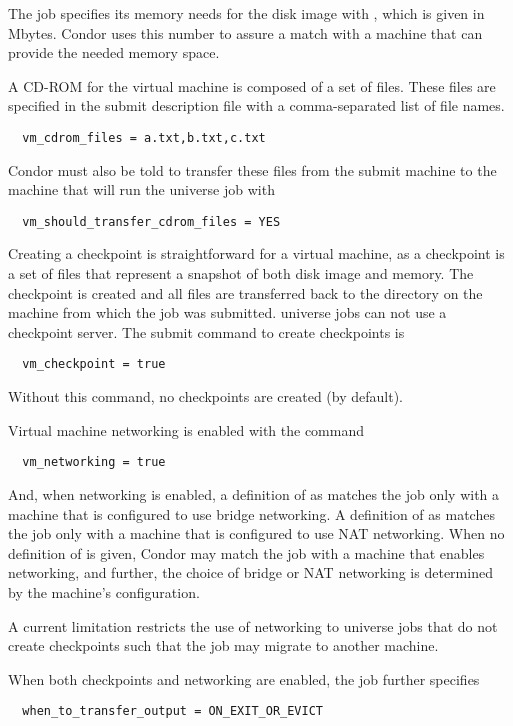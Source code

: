 The job specifies its memory needs 
for the disk image with ,
which is given in Mbytes.
Condor uses this number to assure a match with a machine
that can provide the needed memory space.

A CD-ROM for the virtual machine is composed of a set of files.
These files are specified in the submit description file
with a comma-separated list of file names.
\begin{verbatim}
  vm_cdrom_files = a.txt,b.txt,c.txt
\end{verbatim}
Condor must also be told to transfer these files from
the submit machine to the machine that will run the
 universe job with 
\begin{verbatim}
  vm_should_transfer_cdrom_files = YES
\end{verbatim}

Creating a checkpoint is straightforward for a virtual machine,
as a checkpoint is a set of files that represent
a snapshot of both disk image and memory.
The checkpoint is created and all files are transferred back
to the  directory on the machine from which
the job was submitted.
 universe jobs can not use a checkpoint server.
The submit command to create checkpoints is
\begin{verbatim}
  vm_checkpoint = true
\end{verbatim}
Without this command, no checkpoints are created (by default).

Virtual machine networking is enabled with the command
\begin{verbatim}
  vm_networking = true
\end{verbatim}
And, when networking is enabled, a definition of
 as 
matches the job only with a machine that is configured to use
bridge networking.
A definition of
 as 
matches the job only with a machine that is configured to use
NAT networking.
When no definition of
 is given,
Condor may
match the job with a machine that enables networking,
and further, the choice of bridge or NAT networking
is determined by the machine's configuration.

A current limitation restricts the use of networking to
 universe jobs that do not create checkpoints
such that the job may migrate to another machine.

When both checkpoints and networking are enabled,
the job further specifies
\begin{verbatim}
  when_to_transfer_output = ON_EXIT_OR_EVICT
\end{verbatim}


